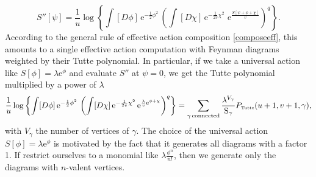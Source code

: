 \documentclass[12pt,here,feynmf]{article}
\begin{document}
\begin{equation}
S''[\psi]=\frac{1}{u}\log\left\{
\int[D\phi]\,\mathrm{e}^{-\frac{1}{2}\phi^{2}}\,
\left(
\int[D\chi]\,\mathrm{e}^{-\frac{1}{2v}\chi^{2}}\,
\,\mathrm{e}^{\frac{S[\psi+\phi+\chi]}{v}}
\right)^{q}
\right\}.
\end{equation} 
According to the general rule of effective action composition \eqref{composeeff}, this amounts to a single effective action computation with Feynman diagrams weighted by their Tutte polynomial. In particular, if we take a universal action like $S[\phi]=\lambda\mathrm{e}^{\phi}$ and evaluate $S''$ at $\psi=0$, we get the Tutte polynomial multiplied by a power of $\lambda$
\begin{equation}
\frac{1}{u}\log\left\{
\int[D\phi]\,\mathrm{e}^{-\frac{1}{2}\phi^{2}}\,
\left(
\int[D\chi]\,\mathrm{e}^{-\frac{1}{2v}\chi^{2}}\,
\mathrm{e}^{\frac{\lambda}{v}\mathrm{e}^{\phi+\chi}}
\right)^{q}
\right\}=\sum_{\gamma\,\mathrm{connected}}
\frac{\lambda^{V_{\gamma}}}{\mathrm{S}_{\gamma}}P_{\mbox{\tiny Tutte}}(u+1,v+1,\gamma),
\label{generating}
\end{equation} 
with $V_{\gamma}$ the number of vertices of $\gamma$.
The choice of the universal action $S[\phi]=\lambda\mathrm{e}^{\phi}$ is motivated by the fact that it generates all diagrams with a factor 1. If restrict ourselves to a monomial like $\lambda\frac{\phi^{n}}{n!}$, then we generate only the diagrams with $n$-valent vertices. 
\end{document}
